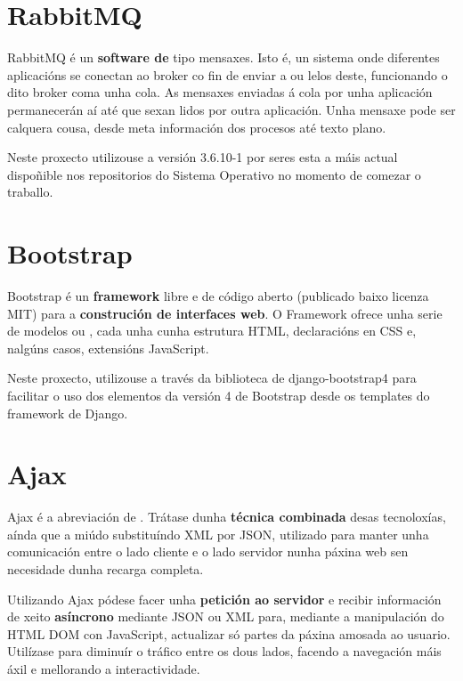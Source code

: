 \section{RabbitMQ}
\label{rabbit}

RabbitMQ é un \textbf{software de } tipo  mensaxes. Isto é, un sistema onde diferentes aplicacións se conectan ao broker co fin de enviar a ou lelos deste, funcionando o dito broker coma unha cola. As mensaxes enviadas á cola por unha aplicación permanecerán aí até que sexan lidos por outra aplicación. Unha mensaxe pode ser calquera cousa, desde meta información dos procesos até texto plano\cite{rabbitmq}.

Neste proxecto utilizouse a versión 3.6.10-1 por seres esta a máis actual dispoñible nos repositorios do Sistema Operativo no momento de comezar o traballo.


\section{Bootstrap}

Bootstrap é un \textbf{framework} libre e de código aberto (publicado baixo licenza MIT) para a \textbf{construción de interfaces web}. O Framework ofrece unha serie de modelos ou , cada unha cunha estrutura HTML, declaracións en CSS e, nalgúns casos, extensións JavaScript.

Neste proxecto, utilizouse a través da biblioteca de django-bootstrap4 para facilitar o uso dos elementos da versión 4 de Bootstrap desde os templates do framework de Django.


\section{Ajax}

Ajax é a abreviación de . Trátase dunha \textbf{técnica combinada} desas tecnoloxías, aínda que a miúdo substituíndo XML por JSON\cite{ajax}, utilizado para manter unha comunicación entre o lado cliente e o lado servidor nunha páxina web sen necesidade dunha recarga completa. 

Utilizando Ajax pódese facer unha \textbf{petición ao servidor} e recibir información de xeito \textbf{asíncrono} mediante JSON ou XML para, mediante a manipulación do HTML DOM con JavaScript, actualizar só partes da páxina amosada ao usuario. Utilízase para diminuír o tráfico entre os dous lados, facendo a navegación máis áxil e mellorando a interactividade.

